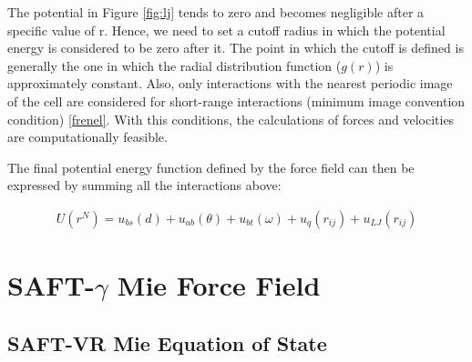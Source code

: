The potential in Figure \ref{fig:lj} tends to zero and becomes negligible after a specific value of r. Hence, we need to set a cutoff radius in which the potential energy is considered to be zero after it. The point in which the cutoff is defined is generally the one in which the radial distribution function ($g(r)$) is approximately constant. Also, only interactions with the nearest periodic image of the cell are considered for short-range interactions (minimum image convention condition) \ref{frenel}. With this conditions, the calculations of forces and velocities are computationally feasible.

The final potential energy function defined by the force field can then be expressed by summing all the interactions above:

\begin{equation}
\begin{aligned}
U(r^N) = u_{bs}(d) + u_{ab}(\theta) + u_{bt}(\omega) + u_{q}(r_{ij}) + u_{LJ}(r_{ij})
\end{aligned}
\end{equation}
	
\section{SAFT-$\gamma$ Mie Force Field}
	
	
	\subsection{SAFT-VR Mie Equation of State }
	
